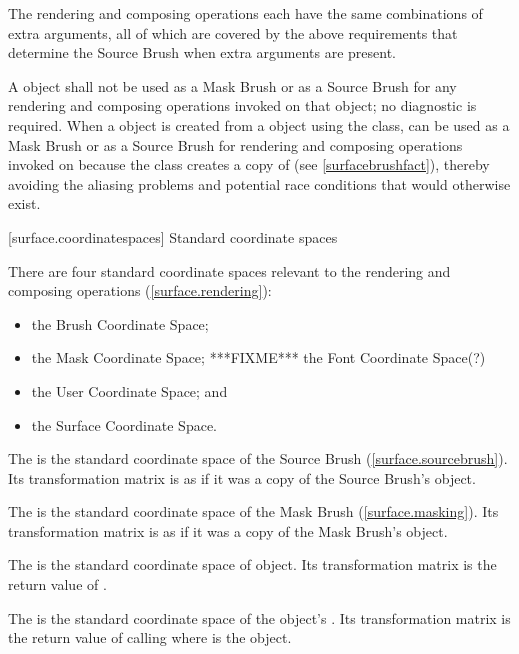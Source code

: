 \pnum
\enternote
The rendering and composing operations each have the same combinations of extra arguments, all of which are covered by the above requirements that determine the Source Brush when extra arguments are present.
\exitnote

\pnum
A  object shall not be used as a Mask Brush or as a Source Brush for any rendering and composing operations invoked on that  object; no diagnostic is required.
\enternote
When a  object  is created from a  object  using the  class,  can be used as a Mask Brush or as a Source Brush for rendering and composing operations invoked on  because the  class creates a copy of  (see \ref{surfacebrushfact}), thereby avoiding the aliasing problems and potential race conditions that would otherwise exist.
\exitnote

 [surface.coordinatespaces] {Standard coordinate spaces}

\pnum
There are four standard coordinate spaces relevant to the rendering and composing operations (\ref{surface.rendering}):
\begin{itemize}
\item the Brush Coordinate Space;
\item the Mask Coordinate Space; ***FIXME*** the Font Coordinate Space(?)
\item the User Coordinate Space; and
\item the Surface Coordinate Space.
\end{itemize}

\pnum
The  is the standard coordinate space of the Source Brush (\ref{surface.sourcebrush}). Its transformation matrix is as if it was a copy of the Source Brush's  object.

\pnum
The  is the standard coordinate space of the Mask Brush (\ref{surface.masking}). Its transformation matrix is as if it was a copy of the Mask Brush's  object.

\pnum
The  is the standard coordinate space of  object. Its transformation matrix is the return value of .%

\pnum
The  is the standard coordinate space of the  object's \underlyingsurface. Its transformation matrix is the return value of calling  where  is the  object.

